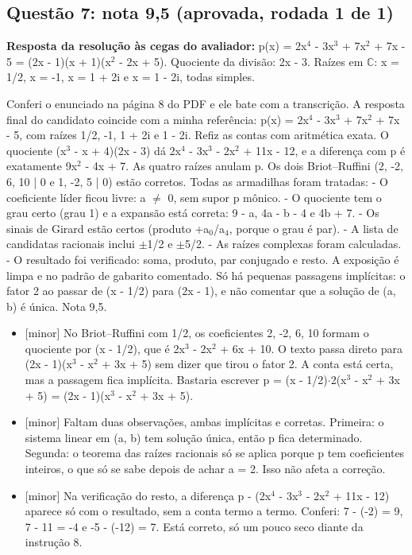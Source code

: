 \documentclass{article}%
\begin{document}
\subsection*{Questão 7: nota 9,5 (aprovada, rodada 1 de 1)}%
\textbf{Resposta da resolução às cegas do avaliador:} p(x) = 2x$^{4}$ - 3x$^3$ + 7x$^2$ + 7x - 5 = (2x - 1)(x + 1)(x$^2$ - 2x + 5). Quociente da divisão: 2x - 3. Raízes em $\mathbb{C}$: x = 1/2, x = -1, x = 1 + 2i e x = 1 - 2i, todas simples.\par %
Conferi o enunciado na página 8 do PDF e ele bate com a transcrição. A resposta final do candidato coincide com a minha referência: p(x) = 2x$^{4}$ - 3x$^3$ + 7x$^2$ + 7x - 5, com raízes 1/2, -1, 1 + 2i e 1 - 2i. Refiz as contas com aritmética exata. O quociente (x$^3$ - x + 4)(2x - 3) dá 2x$^{4}$ - 3x$^3$ - 2x$^2$ + 11x - 12, e a diferença com p é exatamente 9x$^2$ - 4x + 7. As quatro raízes anulam p. Os dois Briot--Ruffini (2, -2, 6, 10 | 0 e 1, -2, 5 | 0) estão corretos.\newline%
\newline%
Todas as armadilhas foram tratadas:\newline%
{-} O coeficiente líder ficou livre: a $\neq$ 0, sem supor p mônico.\newline%
{-} O quociente tem o grau certo (grau 1) e a expansão está correta: 9 - a, 4a - b - 4 e 4b + 7.\newline%
{-} Os sinais de Girard estão certos (produto +a$_{0}$/a$_{4}$, porque o grau é par).\newline%
{-} A lista de candidatas racionais inclui $\pm$1/2 e $\pm$5/2.\newline%
{-} As raízes complexas foram calculadas.\newline%
{-} O resultado foi verificado: soma, produto, par conjugado e resto.\newline%
\newline%
A exposição é limpa e no padrão de gabarito comentado. Só há pequenas passagens implícitas: o fator 2 ao passar de (x - 1/2) para (2x - 1), e não comentar que a solução de (a, b) é única. Nota 9,5.%
\begin{itemize}%
\item%
{[}minor{]} No Briot--Ruffini com 1/2, os coeficientes 2, -2, 6, 10 formam o quociente por (x - 1/2), que é 2x$^3$ - 2x$^2$ + 6x + 10. O texto passa direto para (2x - 1)(x$^3$ - x$^2$ + 3x + 5) sem dizer que tirou o fator 2. A conta está certa, mas a passagem fica implícita. Bastaria escrever p = (x - 1/2)$\cdot$2(x$^3$ - x$^2$ + 3x + 5) = (2x - 1)(x$^3$ - x$^2$ + 3x + 5).%
\item%
{[}minor{]} Faltam duas observações, ambas implícitas e corretas. Primeira: o sistema linear em (a, b) tem solução única, então p fica determinado. Segunda: o teorema das raízes racionais só se aplica porque p tem coeficientes inteiros, o que só se sabe depois de achar a = 2. Isso não afeta a correção.%
\item%
{[}minor{]} Na verificação do resto, a diferença p - (2x$^{4}$ - 3x$^3$ - 2x$^2$ + 11x - 12) aparece só com o resultado, sem a conta termo a termo. Conferi: 7 - (-2) = 9, 7 - 11 = -4 e -5 - (-12) = 7. Está correto, só um pouco seco diante da instrução 8.%
\end{itemize}%
\end{document}

